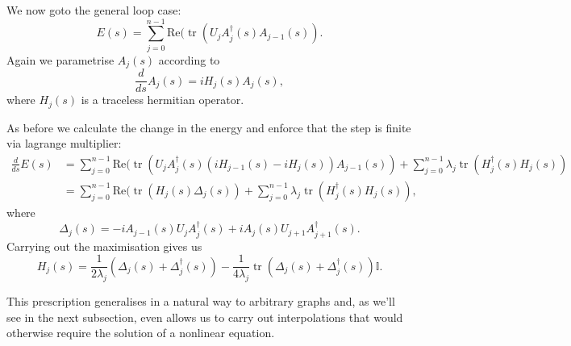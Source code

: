 \documentclass[12pt]{amsart}
\newcommand{\tr}{\operatorname{tr}}
\theoremstyle{definition}
\theoremstyle{remark}
\numberwithin{equation}{section}
\begin{document}
We now goto the general loop case:
\begin{equation}
	E(s) = \sum_{j=0}^{n-1} \text{Re}(\tr(U_j A_j^\dag(s) A_{j-1}(s)).
\end{equation}
Again we parametrise $A_j(s)$ according to
\begin{equation}
	\frac{d}{ds} A_j(s) = i H_j(s) A_j(s),
\end{equation}
where $H_j(s)$ is a traceless hermitian operator.

As before we calculate the change in the energy and enforce that the step is finite via lagrange multiplier:
\begin{equation}
	\begin{split}
	\frac{d}{ds}E(s) &= \sum_{j=0}^{n-1} \text{Re}(\tr(U_j A_j^\dag(s) (iH_{j-1}(s)-iH_j(s)) A_{j-1}(s)) + \sum_{j=0}^{n-1} \lambda_j \tr(H^\dag_j(s)H_j(s)) \\
	&= \sum_{j=0}^{n-1} \text{Re}(\tr(H_j(s)\Delta_j(s)) + \sum_{j=0}^{n-1} \lambda_j \tr(H^\dag_j(s)H_j(s)),
	\end{split}
\end{equation}
where
\begin{equation}
	\Delta_j(s) = -i A_{j-1}(s) U_j A_j^\dag(s) + i A_{j}(s) U_{j+1} A_{j+1}^\dag(s).
\end{equation}
Carrying out the maximisation gives us
\begin{equation}
	H_j(s) = \frac1{2\lambda_j}(\Delta_j(s)+\Delta_j^\dag(s)) - \frac1{4\lambda_j}\tr(\Delta_j(s)+\Delta_j^\dag(s))\mathbb{I}.
\end{equation}

This prescription generalises in a natural way to arbitrary graphs and, as we'll see in the next subsection, even allows us to carry out interpolations that would otherwise require the solution of a nonlinear equation. 

 
\end{document}
